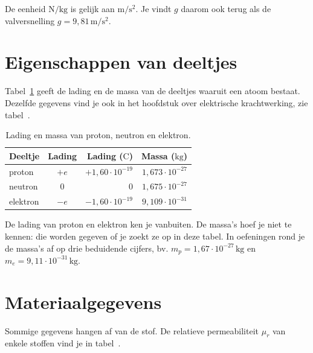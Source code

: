 \documentclass{ximera}
\begin{document}
\begin{remark}[title={Zwaarteveldsterkte en valversnelling}]\nl
    De eenheid $\mathrm{N/kg}$ is gelijk aan $\mathrm{m/s^2}$. Je vindt $g$ daarom ook terug als de valversnelling $g = 9{,}81 \, \mathrm{m/s^2}$.
\end{remark}

\section{Eigenschappen van deeltjes}\label{sec:deeltjes}
Tabel~\ref{tab:deeltjes} geeft de lading en de massa van de deeltjes waaruit een atoom bestaat. Dezelfde gegevens vind je ook in het hoofdstuk over elektrische krachtwerking, zie tabel~.

\begin{table}[ht!]
    \begin{center}
        \begin{tabular}{l c r r}
            \toprule
            Deeltje & Lading & Lading ($\mathrm{C}$) & Massa ($\mathrm{kg}$) \\
            \midrule
            proton & $+e$ & $+1{,}60 \cdot 10^{-19}$ & $1{,}673 \cdot 10^{-27}$ \\
            neutron & $0$ & $0$ & $1{,}675 \cdot 10^{-27}$ \\
            elektron & $-e$ & $-1{,}60 \cdot 10^{-19}$ & $9{,}109 \cdot 10^{-31}$ \\
            \bottomrule
        \end{tabular}
    \end{center}
    \caption{Lading en massa van proton, neutron en elektron.}
    \label{tab:deeltjes}
\end{table}

\begin{remark}[title={Wat moet je kennen?}]\nl
    De lading van proton en elektron ken je vanbuiten. De massa's hoef je niet te kennen: die worden gegeven of je zoekt ze op in deze tabel. In oefeningen rond je de massa's af op drie beduidende cijfers, bv. $m_p = 1{,}67 \cdot 10^{-27} \, \mathrm{kg}$ en $m_e = 9{,}11 \cdot 10^{-31} \, \mathrm{kg}$.
\end{remark}

\section{Materiaalgegevens}\label{sec:materiaalgegevens}
Sommige gegevens hangen af van de stof. De relatieve permeabiliteit $\mu_r$ van enkele stoffen vind je in tabel~.
\end{document}
